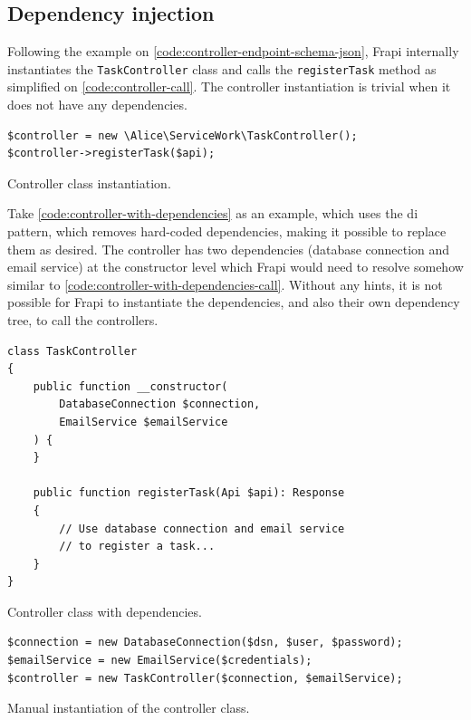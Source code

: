 \subsection{Dependency injection}
\label{sec:dependency-injection}

Following the example on \autoref{code:controller-endpoint-schema-json}, Frapi internally instantiates the \texttt{TaskController} class and calls the \texttt{registerTask} method as simplified on \autoref{code:controller-call}. The controller instantiation is trivial when it does not have any dependencies.

\begin{listing}[htbp]
\begin{verbatim}
$controller = new \Alice\ServiceWork\TaskController();
$controller->registerTask($api);
\end{verbatim}
\caption{Controller class instantiation.}
\label{code:controller-call}
\end{listing}

Take \autoref{code:controller-with-dependencies} as an example, which uses the \acrfull{di} \cite{php-the-right-way-di} pattern, which removes hard-coded dependencies, making it possible to replace them as desired. The controller has two dependencies (database connection and email service) at the constructor level which Frapi would need to resolve somehow similar to \autoref{code:controller-with-dependencies-call}. Without any hints, it is not possible for Frapi to instantiate the dependencies, and also their own dependency tree, to call the controllers.

\begin{listing}[htbp]
\begin{verbatim}
class TaskController
{
	public function __constructor(
		DatabaseConnection $connection,
		EmailService $emailService
	) {
	}

	public function registerTask(Api $api): Response
	{
		// Use database connection and email service
		// to register a task...
	}
}
\end{verbatim}
\caption{Controller class with dependencies.}
\label{code:controller-with-dependencies}
\end{listing}

\begin{listing}[htbp]
\begin{verbatim}
$connection = new DatabaseConnection($dsn, $user, $password);
$emailService = new EmailService($credentials);
$controller = new TaskController($connection, $emailService);
\end{verbatim}
\caption{Manual instantiation of the controller class.}
\label{code:controller-with-dependencies-call}
\end{listing}

